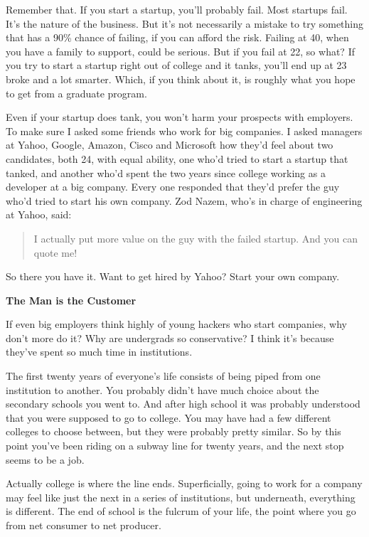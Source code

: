 Remember that. If you start a startup, you'll probably fail. Most
startups fail. It's the nature of the business. But it's not necessarily
a mistake to try something that has a 90\% chance of failing, if you can
afford the risk. Failing at 40, when you have a family to support, could
be serious. But if you fail at 22, so what? If you try to start a
startup right out of college and it tanks, you'll end up at 23 broke and
a lot smarter. Which, if you think about it, is roughly what you hope to
get from a graduate program.

Even if your startup does tank, you won't harm your prospects with
employers. To make sure I asked some friends who work for big companies.
I asked managers at Yahoo, Google, Amazon, Cisco and Microsoft how
they'd feel about two candidates, both 24, with equal ability, one who'd
tried to start a startup that tanked, and another who'd spent the two
years since college working as a developer at a big company. Every one
responded that they'd prefer the guy who'd tried to start his own
company. Zod Nazem, who's in charge of engineering at Yahoo, said:

\begin{quote}
I actually put more value on the guy with the failed startup. And you
can quote me!
\end{quote}

So there you have it. Want to get hired by Yahoo? Start your own
company.

\textbf{The Man is the Customer}

If even big employers think highly of young hackers who start companies,
why don't more do it? Why are undergrads so conservative? I think it's
because they've spent so much time in institutions.

The first twenty years of everyone's life consists of being piped from
one institution to another. You probably didn't have much choice about
the secondary schools you went to. And after high school it was probably
understood that you were supposed to go to college. You may have had a
few different colleges to choose between, but they were probably pretty
similar. So by this point you've been riding on a subway line for twenty
years, and the next stop seems to be a job.

Actually college is where the line ends. Superficially, going to work
for a company may feel like just the next in a series of institutions,
but underneath, everything is different. The end of school is the
fulcrum of your life, the point where you go from net consumer to net
producer.

